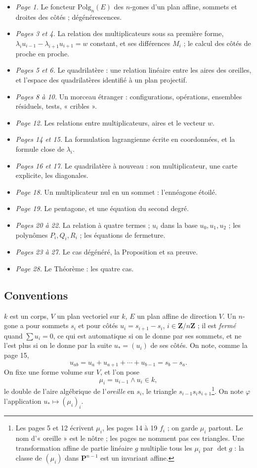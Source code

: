 \documentclass[11pt,a4paper]{article}
\begin{document}
\begin{itemize}
  \item \emph{Page 1.} Le foncteur $\mathrm{Polg}_n(E)$ des $n$-gones d'un plan
    affine, sommets et droites des côtés ; dégénérescences.
  \item \emph{Pages 3 et 4.} La relation des multiplicateurs sous sa première
    forme, $\lambda_i u_{i-1} - \lambda_{i+1} u_{i+1} = w$ constant, et ses
    différences $M_i$ ; le calcul des côtés de proche en proche.
  \item \emph{Pages 5 et 6.} Le quadrilatère : une relation linéaire entre les
    aires des oreilles, et l'espace des quadrilatères identifié à un plan
    projectif.
  \item \emph{Pages 8 à 10.} Un morceau étranger : configurations, opérations,
    ensembles résiduels, tests, « cribles ».
  \item \emph{Page 12.} Les relations entre multiplicateurs, aires et le
    vecteur $w$.
  \item \emph{Pages 14 et 15.} La formulation lagrangienne écrite en
    coordonnées, et la formule close de $\lambda_i$.
  \item \emph{Pages 16 et 17.} Le quadrilatère à nouveau : son multiplicateur,
    une carte explicite, les diagonales.
  \item \emph{Page 18.} Un multiplicateur nul en un sommet : l'ennéagone étoilé.
  \item \emph{Page 19.} Le pentagone, et une équation du second degré.
  \item \emph{Pages 20 à 22.} La relation à quatre termes ; $u_i$ dans la base
    $u_0, u_1, u_2$ ; les polynômes $P_i, Q_i, R_i$ ; les équations de
    fermeture.
  \item \emph{Pages 23 à 27.} Le cas dégénéré, la Proposition et sa preuve.
  \item \emph{Page 28.} Le Théorème : les quatre cas.
\end{itemize}

\subsection*{Conventions}

$k$ est un corps, $V$ un plan vectoriel sur $k$, $E$ un plan affine de
direction $V$. Un $n$-gone a pour sommets $s_i$ et pour côtés
$u_i = s_{i+1} - s_i$, $i \in \mathbf{Z}/n\mathbf{Z}$ ; il est \emph{fermé}
quand $\sum u_i = 0$, ce qui est automatique si on le donne par ses sommets,
et ne l'est plus si on le donne par la suite $u_* = (u_i)$ de ses côtés. On
note, comme la page 15,
\[
  u_{ab} = u_a + u_{a+1} + \cdots + u_{b-1} = s_b - s_a .
\]
On fixe une forme volume sur $V$, et l'on pose
\[
  \mu_i = u_{i-1} \wedge u_i \in k ,
\]
le double de l'aire algébrique de l'\emph{oreille} en $s_i$, le triangle
$s_{i-1} s_i s_{i+1}$\footnote{Les pages 5 et 12 écrivent $\mu_i$, les pages 14
à 19 $f_i$ ; on garde $\mu_i$ partout. Le nom d'« oreille » est le nôtre ; les
pages ne nomment pas ces triangles. Une transformation affine de partie linéaire
$g$ multiplie tous les $\mu_i$ par $\det g$ : la classe de $(\mu_i)$ dans
$\mathbf{P}^{n-1}$ est un invariant affine.}. On note $\varphi$ l'application
$u_* \mapsto (\mu_i)_i$.
\end{document}
